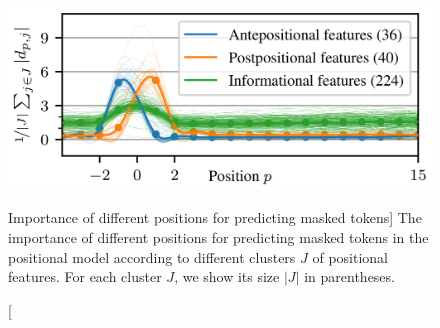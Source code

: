 \begin{figure}
\centering
\includegraphics[width=0.7\columnwidth]{positional-features.png}
\vspace{-0.2cm}
\caption
  [Importance of different positions for predicting masked tokens]%
  {The importance of different positions for predicting masked tokens in
   the positional model according to different clusters $J$ of positional
   features. For each cluster $J$, we show its size $|J|$ in parentheses.
   \cite[Figure 4]{novotny2021when}}
\protect{}
\protect{}
\protect{}
\label{fig:position-independent-token-embeddings-interpretability}
\end{figure}
